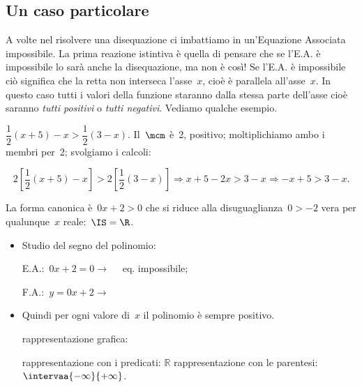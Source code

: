 \subsection{Un caso particolare}

A volte nel risolvere una disequazione ci imbattiamo in un'Equazione 
Associata impossibile. 
La prima reazione istintiva è quella di pensare che se l'E.A. è 
impossibile lo sarà anche la disequazione, ma non è così! 
Se l'E.A. è impossibile ciò significa che la retta non interseca 
l'asse~\(x\), 
cioè è parallela all'asse~\(x\). In questo caso tutti i valori della funzione 
staranno dalla stessa parte dell'asse cioè saranno \emph{tutti positivi} o 
\emph{tutti negativi}. 
Vediamo qualche esempio.


\begin{esempio}{}{}
\(\dfrac{1}{2} (x+5)-x>\dfrac{1}{2} (3-x).\)
Il~\(\mcm\) è~2, positivo; moltiplichiamo ambo i membri per~2; svolgiamo
i calcoli:

\[2 \left[\frac{1}{2}(x+5)-x\right]>2
\left[\frac{1}{2}(3-x)\right]\Rightarrow x+5-2x>3-x\Rightarrow -x+5>3-x.\]

La forma canonica è~\(0 x + 2 > 0\) che si riduce alla disuguaglianza~\(0>-2\)
vera per qualunque~\(x\) reale:~\(\IS=\R\).
\begin{itemize} [noitemsep]
 \item Studio del segno del polinomio:\\
 \begin{minipage}{.45\textwidth}
  E.A.:~\(0 x + 2 = 0  \rightarrow \quad \) eq. impossibile;
 \end{minipage}
 \begin{minipage}{.25\textwidth}
  F.A.:~\(y=0 x + 2 \rightarrow \)
 \end{minipage}
 \begin{minipage}{.3\textwidth}
  \segnipos
 \end{minipage}
 \item Quindi per ogni valore di~\(x\) il polinomio è sempre positivo. 
 \subitem 
  \begin{minipage}{.35\textwidth}
   rappresentazione grafica: 
  \end{minipage}
  \begin{minipage}{.30\textwidth}
  \end{minipage}
 \subitem rappresentazione con i predicati: \quad \(\mathbb{R}\) 
 \subitem rappresentazione con le parentesi: 
\quad \(\intervaa{-\infty}{+\infty}\). 
\end{itemize}
\end{esempio}


